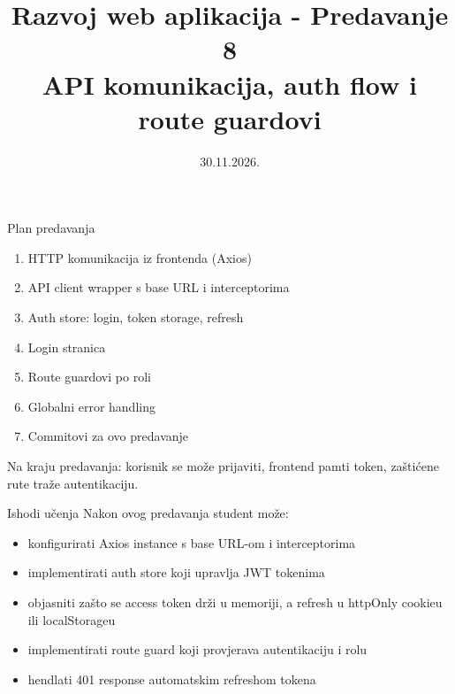 

\title[Razvoj web aplikacija]{Razvoj web aplikacija - Predavanje 8 \\ API komunikacija, auth flow i route guardovi}
\date{30.11.2026.}



\frame{\titlepage}

\begin{frame}{Plan predavanja}
\begin{enumerate}
  \item HTTP komunikacija iz frontenda (Axios)
  \item API client wrapper s base URL i interceptorima
  \item Auth store: login, token storage, refresh
  \item Login stranica
  \item Route guardovi po roli
  \item Globalni error handling
  \item Commitovi za ovo predavanje
\end{enumerate}

\vspace{0.6em}
Na kraju predavanja: korisnik se može prijaviti, frontend pamti token, zaštićene rute traže autentikaciju.
\end{frame}

\begin{frame}{Ishodi učenja}
Nakon ovog predavanja student može:
\begin{itemize}
  \item konfigurirati Axios instance s base URL-om i interceptorima
  \item implementirati auth store koji upravlja JWT tokenima
  \item objasniti zašto se access token drži u memoriji, a refresh u httpOnly cookieu ili localStorageu
  \item implementirati route guard koji provjerava autentikaciju i rolu
  \item hendlati 401 response automatskim refreshom tokena
\end{itemize}
\end{frame}

